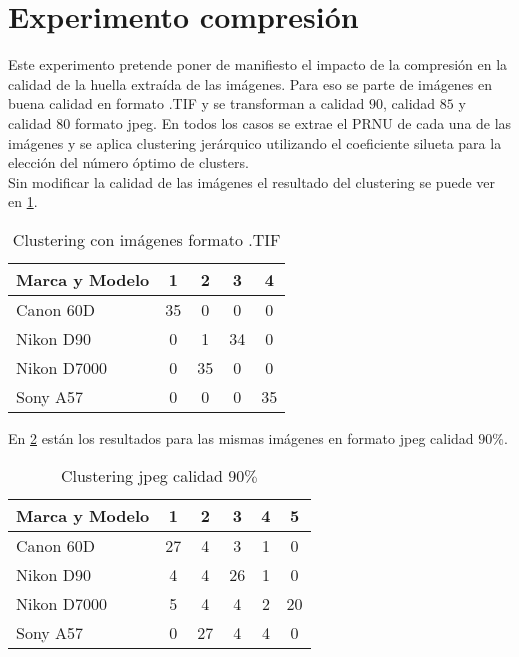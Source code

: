 \section{Experimento compresión}
Este experimento pretende poner de manifiesto el impacto de la compresión en la calidad de la huella extraída de las imágenes. Para eso se parte de imágenes en buena calidad en formato .TIF y se transforman a calidad $90$, calidad $85$ y calidad $80$ formato jpeg. En todos los casos se extrae el PRNU de cada una de las imágenes y se aplica clustering jerárquico utilizando el coeficiente silueta para la elección del número óptimo de clusters. \\

Sin modificar la calidad de las imágenes el resultado del clustering se puede ver en \ref{tabla:compresion100}.

\begin{table}[!htb]
    \centering
        \begin{tabular}{|l|c|c|c|c|}
        \hline
        \rowcolor[gray]{0.9}
        \textbf{Marca y Modelo} & 1 & 2 & 3 & 4 \\ \hline
        Canon 60D & 35 & 0 & 0 & 0 \\ \hline
        Nikon D90 & 0 & 1 & 34 & 0 \\ \hline
        Nikon D7000 & 0 & 35 & 0 & 0 \\ \hline
        Sony A57 & 0 & 0 & 0 & 35 \\ \hline
        \end{tabular}
    \caption{Clustering con imágenes formato .TIF}
    \label{tabla:compresion100}
\end{table}

En \ref{tabla:compresion90} están los resultados para las mismas imágenes en formato jpeg calidad $90\%$.

\begin{table}[!htb]
    \centering
        \begin{tabular}{|l|c|c|c|c|c|}
        \hline
        \rowcolor[gray]{0.9}
        \textbf{Marca y Modelo} & 1 & 2 & 3 & 4 & 5\\ \hline
        Canon 60D & 27 & 4 & 3 & 1 & 0 \\ \hline
        Nikon D90 & 4 & 4 & 26 & 1 & 0 \\ \hline
        Nikon D7000 & 5 & 4 & 4 & 2 & 20 \\ \hline
        Sony A57 & 0 & 27 & 4 & 4 & 0 \\ \hline
        \end{tabular}
    \caption{Clustering jpeg calidad $90\%$}
    \label{tabla:compresion90}
\end{table}

